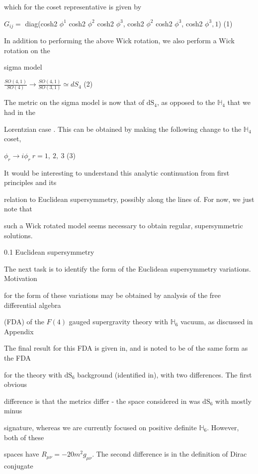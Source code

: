 \documentclass[a4paper,12pt]{article}
\begin{document}
which for the coset representative is given by

$G_{ij}=$ diag(cosh2 $\phi^{1}$ cosh2 $\phi^{2}$ cosh2 $\phi^{3}$, cosh2 $\phi^{2}$ cosh2 $\phi^{3}$, cosh2 $\phi^{3},1$) (1)

In addition to performing the above Wick rotation, we also perform a Wick rotation on the

sigma model
\begin{center}
$\displaystyle \frac{SO(4,1)}{SO(4)}\rightarrow\frac{SO(4,1)}{SO(3,1)}\simeq dS_{4}$   (2)
\end{center}
The metric on the sigma model is now that of $\mathrm{d}\mathrm{S}_{4}$, as opposed to the $\mathbb{H}_{4}$ that we had in the

Lorentzian case . This can be obtained by making the following change to the $\mathbb{H}_{4}$ coset,
\begin{center}
$\phi_{r}\rightarrow i\phi_{r}\ r=1,\ 2,\ 3$   (3)
\end{center}
It would be interesting to understand this analytic continuation from first principles and its

relation to Euclidean supersymmetry, possibly along the lines of. For now, we just note that

such a Wick rotated model seems necessary to obtain regular, supersymmetric solutions.

0.1 Euclidean supersymmetry

The next task is to identify the form of the Euclidean supersymmetry variations. Motivation

for the form of these variations may be obtained by analysis of the free differential algebra

(FDA) of the $F(4)$ gauged supergravity theory with $\mathbb{H}_{6}$ vacuum, as discussed in Appendix

The final result for this FDA is given in, and is noted to be of the same form as the FDA

for the theory with $\mathrm{d}\mathrm{S}_{6}$ background (identified in), with two differences. The first obvious

difference is that the metrics differ - the space considered in was $\mathrm{d}\mathrm{S}_{6}$ with mostly minus

signature, whereas we are currently focused on positive definite $\mathbb{H}_{6}$. However, both of these

spaces have $R_{\mu\nu}= -20m^{2}g_{\mu\nu}$. The second difference is in the definition of Dirac conjugate
\end{document}

